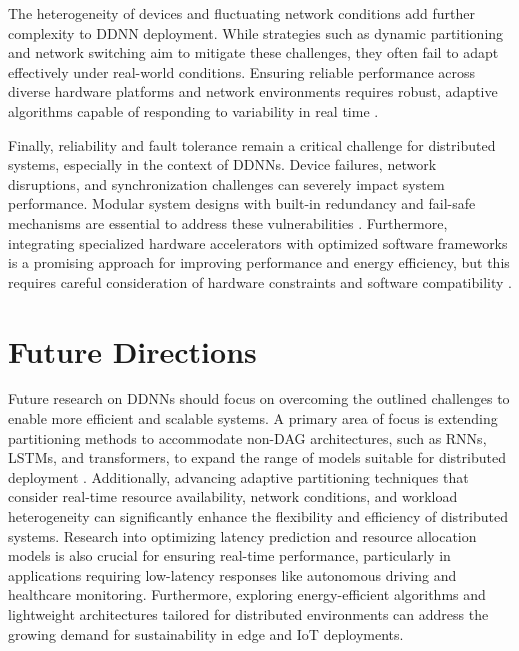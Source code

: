 \documentclass[conference]{IEEEtran}
\begin{document}
The heterogeneity of devices and fluctuating network conditions add further complexity to DDNN deployment. While strategies such as dynamic partitioning and network switching aim to mitigate these challenges, they often fail to adapt effectively under real-world conditions. Ensuring reliable performance across diverse hardware platforms and network environments requires robust, adaptive algorithms capable of responding to variability in real time \cite{karjee2022split, li2019edge}.


Finally, reliability and fault tolerance remain a critical challenge for distributed systems, especially in the context of DDNNs. Device failures, network disruptions, and synchronization challenges can severely impact system performance. Modular system designs with built-in redundancy and fail-safe mechanisms are essential to address these vulnerabilities \cite{zeng2020coedge}. Furthermore, integrating specialized hardware accelerators with optimized software frameworks is a promising approach for improving performance and energy efficiency, but this requires careful consideration of hardware constraints and software compatibility \cite{kress2022hardware, naveen2021low}.








\section{Future Directions}

Future research on DDNNs should focus on overcoming the outlined challenges to enable more efficient and scalable systems. A primary area of focus is extending partitioning methods to accommodate non-DAG architectures, such as RNNs, LSTMs, and transformers, to expand the range of models suitable for distributed deployment \cite{zhang2021dynamic, zhao2018deepthings}. Additionally, advancing adaptive partitioning techniques that consider real-time resource availability, network conditions, and workload heterogeneity can significantly enhance the flexibility and efficiency of distributed systems. Research into optimizing latency prediction and resource allocation models is also crucial for ensuring real-time performance, particularly in applications requiring low-latency responses like autonomous driving and healthcare monitoring. Furthermore, exploring energy-efficient algorithms and lightweight architectures tailored for distributed environments can address the growing demand for sustainability in edge and IoT deployments.
\end{document}
